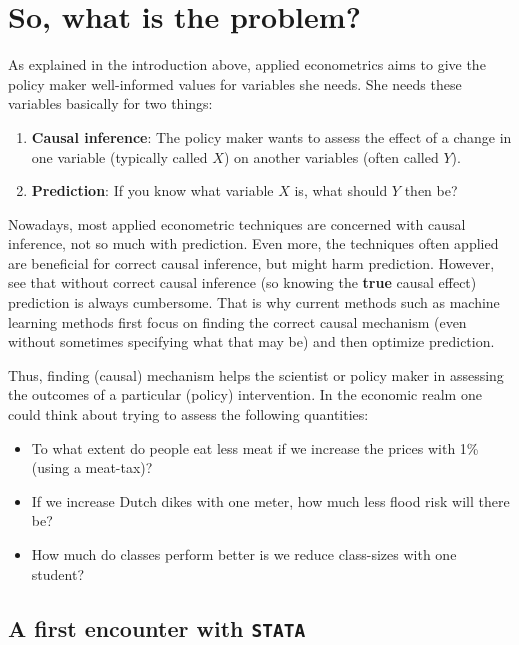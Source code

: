\documentclass[
]{book}
\providecommand{\tightlist}{%
  \setlength{\itemsep}{0pt}\setlength{\parskip}{0pt}}
\begin{document}
\hypertarget{secproblem}{%
\section{So, what is the problem?}\label{secproblem}}

As explained in the introduction above, applied econometrics aims to give the policy maker well-informed values for variables she needs. She needs these variables basically for two things:

\begin{enumerate}
\def\labelenumi{\arabic{enumi}.}
\tightlist
\item
  \textbf{Causal inference}: The policy maker wants to assess the effect of a change in one variable (typically called \(X\)) on another variables (often called \(Y\)).
\item
  \textbf{Prediction}: If you know what variable \(X\) is, what should \(Y\) then be?
\end{enumerate}

Nowadays, most applied econometric techniques are concerned with causal inference, not so much with prediction. Even more, the techniques often applied are beneficial for correct causal inference, but might harm prediction. However, see that without correct causal inference (so knowing the \textbf{true} causal effect) prediction is always cumbersome. That is why current methods such as machine learning methods first focus on finding the correct causal mechanism (even without sometimes specifying what that may be) and then optimize prediction.

Thus, finding (causal) mechanism helps the scientist or policy maker in assessing the outcomes of a particular (policy) intervention. In the economic realm one could think about trying to assess the following quantities:

\begin{itemize}
\tightlist
\item
  To what extent do people eat less meat if we increase the prices with 1\% (using a meat-tax)?
\item
  If we increase Dutch dikes with one meter, how much less flood risk will there be?
\item
  How much do classes perform better is we reduce class-sizes with one student?
\end{itemize}

\hypertarget{a-first-encounter-with-stata}{%
\subsection{\texorpdfstring{A first encounter with \texttt{STATA}}{A first encounter with STATA}}\label{a-first-encounter-with-stata}}
\end{document}
